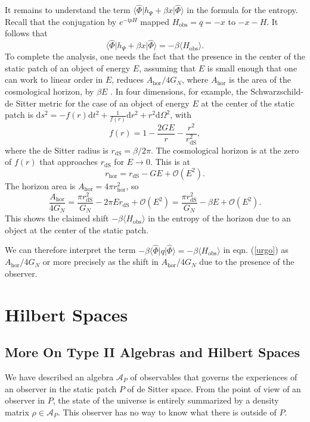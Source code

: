 \documentclass[11pt,a4paper]{article}
\def\be{\begin{equation}}
\def\ee{\end{equation}}
\def\h{\widehat}
\def\O{{\mathcal O}}
\def\A{{\mathcal A}}
\def\d{{\mathrm d}}
\def\h{\widehat}
\def\hor{{\mathrm{hor}}}
\def\dS{{\mathrm{dS}}}
\def\la{\langle}
\def\ra{\rangle}
\def\obs{{\mathrm{obs}}}
\def\i{{\mathrm i}}
\begin{document}
 It remains to understand the term $\la\h\Phi|h_\Psi+\beta x|\h\Phi\ra$ in the formula for the entropy.   Recall that the conjugation by $e^{-\i p H}$ mapped $H_\obs = q = -x$ to $-x - H$. It follows that
\be
\la\h\Phi|h_\Psi+\beta x|\h\Phi\ra = - \beta \la H_\obs \ra.
\ee
 To complete the analysis, one needs the fact that the presence in the center of the static patch of an object of energy $E$, assuming that $E$ is small enough
 that one can work to linear order in $E$, reduces $A_\hor/4G_N$, where $A_\hor$ is the area of the cosmological horizon, by $\beta E$ \cite{Susskind}.
 In four dimensions, for example, the Schwarzschild-de Sitter
 metric for the case of an object of energy $E$ at the center of the static patch is $\d s^2=-f(r) \d t^2+\frac{1}{f(r)}\d r^2+r^2\d\Omega^2$, with
 \be\label{metfac} f(r) = 1-\frac{2 GE}{r} -\frac{r^2}{r_\dS^2}, \ee
 where the de Sitter radius is $r_\dS=\beta/2\pi$.   The cosmological horizon is at the zero of $f(r)$ that approaches $r_\dS$ for $E\to 0$.
 This is at
 \be\label{etfac}r_\hor =r_\dS-GE+\O(E^2). \ee
 The horizon area is $A_\hor=4\pi r_\hor^2$, so
 \be\label{neffac}\frac{A_\hor}{4 G_N}= \frac{\pi r_\dS^2}{ G_N}-2\pi E r_\dS+\O(E^2)=\frac{\pi r_\dS^2}{G_N}-\beta E    +\O(E^2).\ee
 This shows the claimed shift $-\beta\la H_\obs\ra$ in the entropy of the horizon due to an object at the center of the static patch.
 
 We can therefore interpret the term $-\beta\la\h\Phi|q|\h\Phi\ra=-\beta\la H_\obs\ra$ in eqn. (\ref{urgo}) as $A_{\hor}/4G_N$ or more precisely as the shift
 in $A_{\hor}/4G_N$ due to the presence of the observer.
 
 
 



 


\section{Hilbert Spaces}\label{hilbertspaces}


\subsection{More On Type II Algebras and Hilbert Spaces}\label{more}

We have described an algebra $\A_P$ of observables that governs the experiences of an observer in the static patch $P$ of de Sitter space.  From the point of view
of an observer in $P$, the state of the universe is entirely summarized by a density matrix $\rho\in\A_P$.    
This observer has no way to know what there is outside of $P$.  
\end{document}
